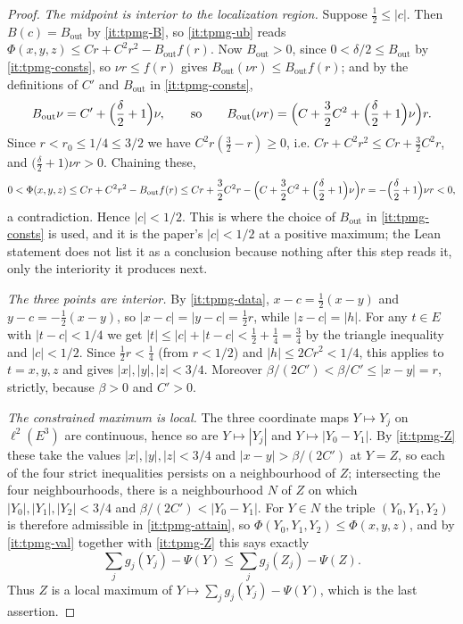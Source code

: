 \begin{proof}
\emph{The midpoint is interior to the localization region.} Suppose
$\tfrac12\le|c|$. Then $B(c)=B_{\mathrm{out}}$ by \ref{it:tpmg-B}, so
\ref{it:tpmg-ub} reads
$\Phi(x,y,z)\le Cr+C^2r^2-B_{\mathrm{out}}f(r)$. Now
$B_{\mathrm{out}}>0$, since $0<\delta/2\le B_{\mathrm{out}}$ by
\ref{it:tpmg-consts}, so $\nu r\le f(r)$ gives
$B_{\mathrm{out}}(\nu r)\le B_{\mathrm{out}}f(r)$; and by the definitions of
$C'$ and $B_{\mathrm{out}}$ in \ref{it:tpmg-consts},
\[
  B_{\mathrm{out}}\nu=C'+\Bigl(\frac\delta2+1\Bigr)\nu,
  \qquad\text{so}\qquad
  B_{\mathrm{out}}(\nu r)
   =\Bigl(C+\frac32C^2+\Bigl(\frac\delta2+1\Bigr)\nu\Bigr)r .
\]
Since $r<r_0\le1/4\le3/2$ we have $C^2r(\tfrac32-r)\ge0$, i.e.
$Cr+C^2r^2\le Cr+\tfrac32C^2r$, and
$\bigl(\tfrac\delta2+1\bigr)\nu r>0$. Chaining these,
\[
  0<\Phi(x,y,z)\le Cr+C^2r^2-B_{\mathrm{out}}f(r)
   \le Cr+\frac32C^2r-\Bigl(C+\frac32C^2+\Bigl(\frac\delta2+1\Bigr)\nu\Bigr)r
   =-\Bigl(\frac\delta2+1\Bigr)\nu r<0,
\]
a contradiction. Hence $|c|<1/2$. This is where the choice of
$B_{\mathrm{out}}$ in \ref{it:tpmg-consts} is used, and it is the paper's
$|c|<1/2$ at a positive maximum; the Lean statement does not list it as a
conclusion because nothing after this step reads it, only the interiority it
produces next.

\emph{The three points are interior.} By \ref{it:tpmg-data},
$x-c=\tfrac12(x-y)$ and $y-c=-\tfrac12(x-y)$, so
$|x-c|=|y-c|=\tfrac12r$, while $|z-c|=|h|$. For any $t\in E$ with
$|t-c|<1/4$ we get $|t|\le|c|+|t-c|<\tfrac12+\tfrac14=\tfrac34$ by the
triangle inequality and $|c|<1/2$. Since $\tfrac12r<\tfrac14$ (from
$r<1/2$) and $|h|\le2Cr^2<1/4$, this applies to $t=x,y,z$ and gives
$|x|,|y|,|z|<3/4$. Moreover $\beta/(2C')<\beta/C'\le|x-y|=r$, strictly,
because $\beta>0$ and $C'>0$.

\emph{The constrained maximum is local.} The three coordinate maps
$Y\mapsto Y_j$ on $\ell^2(E^3)$ are continuous, hence so are
$Y\mapsto|Y_j|$ and $Y\mapsto|Y_0-Y_1|$. By \ref{it:tpmg-Z} these take the
values $|x|,|y|,|z|<3/4$ and $|x-y|>\beta/(2C')$ at $Y=Z$, so each of the four
strict inequalities persists on a neighbourhood of $Z$; intersecting the four
neighbourhoods, there is a neighbourhood $N$ of $Z$ on which
$|Y_0|,|Y_1|,|Y_2|<3/4$ and $\beta/(2C')<|Y_0-Y_1|$. For $Y\in N$ the triple
$(Y_0,Y_1,Y_2)$ is therefore admissible in \ref{it:tpmg-attain}, so
$\Phi(Y_0,Y_1,Y_2)\le\Phi(x,y,z)$, and by \ref{it:tpmg-val} together with
\ref{it:tpmg-Z} this says exactly
\[
  \sum_jg_j(Y_j)-\Psi(Y)\le\sum_jg_j(Z_j)-\Psi(Z).
\]
Thus $Z$ is a local maximum of $Y\mapsto\sum_jg_j(Y_j)-\Psi(Y)$, which is the
last assertion.
\end{proof}
